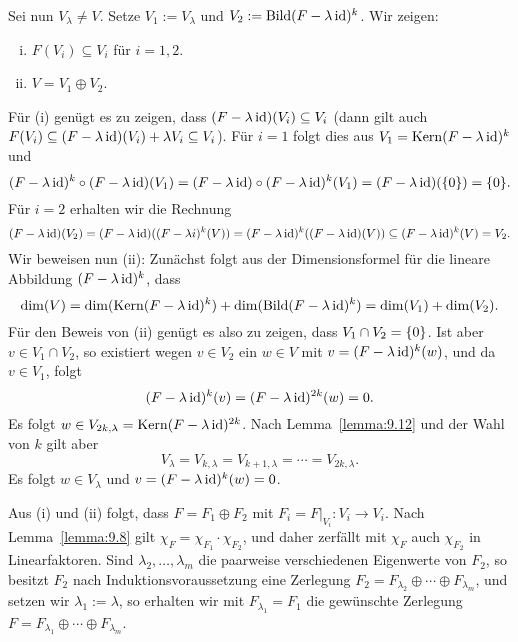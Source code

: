 \begin{beweis}
	Sei nun $V_\lambda \neq V$.
	Setze $V_1 := V_\lambda$ und $V_2 := \operatorname{Bild}(F - \lambda \operatorname{id})^k$.
	Wir zeigen:
	\begin{enumerate}[(i)]
		\item $F(V_i) \subseteq V_i$ für $i = 1,2$.
		\item $V = V_1 \oplus V_2$.
	\end{enumerate}
	Für (i) genügt es zu zeigen, dass $(F - \lambda \operatorname{id})(V_i) \subseteq V_i$ (dann gilt auch $F(V_i) \subseteq (F-\lambda \operatorname{id})(V_i) + \lambda V_i \subseteq V_i$).
	Für $i = 1$ folgt dies aus $V_1 = \operatorname{Kern}(F - \lambda \operatorname{id})^k$ und
	\[
		(F-\lambda \operatorname{id})^k \circ (F-\lambda \operatorname{id})(V_1) = (F - \lambda \operatorname{id}) \circ (F - \lambda \operatorname{id})^k(V_1) = (F - \lambda \operatorname{id})(\{0\}) = \{0\}.
	\]
	Für $i = 2$ erhalten wir die Rechnung
	\[
		(F-\lambda \operatorname{id})(V_2) = (F-\lambda \operatorname{id})((F-\lambda i)^k(V)) = (F - \lambda \operatorname{id})^k((F - \lambda \operatorname{id})(V)) \subseteq (F-\lambda \operatorname{id})^k(V) = V_2.
	\]
	Wir beweisen nun (ii):
	Zunächst folgt aus der Dimensionsformel für die lineare Abbildung $(F-\lambda \operatorname{id})^k$, dass
	\[
		\dim(V) = \dim(\operatorname{Kern}(F - \lambda \operatorname{id})^k) + \dim(\operatorname{Bild}(F - \lambda \operatorname{id})^k) = \dim(V_1) + \dim(V_2).
	\]
	Für den Beweis von (ii) genügt es also zu zeigen, dass $V_1 \cap V_2 = \{0\}$.
	Ist aber $v \in V_1 \cap V_2$, so existiert wegen $v \in V_2$ ein $w \in V$ mit $v = (F-\lambda \operatorname{id})^k(w)$, und da $v \in V_1$, folgt
	\[
		(F- \lambda \operatorname{id})^k(v) = (F - \lambda \operatorname{id})^{2k}(w) = 0.
	\]
	Es folgt $w \in V_{2k,\lambda} = \operatorname{Kern}(F - \lambda \operatorname{id})^{2k}$.
	Nach Lemma~\ref{lemma:9.12} und der Wahl von $k$ gilt aber
	\[
		V_\lambda = V_{k,\lambda} = V_{k+1,\lambda} = \cdots = V_{2k,\lambda}.
	\]
	Es folgt $w \in V_{\lambda}$ und $v = (F - \lambda \operatorname{id})^{k}(w) = 0$.
	
	Aus (i) und (ii) folgt, dass $F = F_1 \oplus F_2$ mit $F_i = F\big|_{V_i} \colon V_i \rightarrow V_i$.
	Nach Lemma~\ref{lemma:9.8} gilt $\chi_F = \chi_{F_1} \cdot \chi_{F_2}$, und daher zerfällt mit $\chi_F$ auch $\chi_{F_2}$ in Linearfaktoren.
	Sind $\lambda_2,\dots,\lambda_m$ die paarweise verschiedenen Eigenwerte von $F_2$, so besitzt $F_2$ nach Induktionsvoraussetzung eine Zerlegung $F_2 = F_{\lambda_2} \oplus \cdots \oplus F_{\lambda_m}$, und setzen wir $\lambda_1 := \lambda$, so erhalten wir mit $F_{\lambda_1} = F_1$ die gewünschte Zerlegung $F = F_{\lambda_1} \oplus \cdots \oplus F_{\lambda_m}$. 
\end{beweis}

